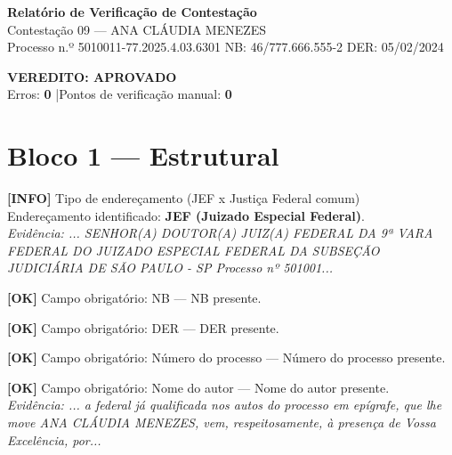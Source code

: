 \documentclass[12pt,a4paper]{article}
\newcommand{\statusOK}[1]{\textcolor{corOK}{\textbf{[OK]}} #1}
\newcommand{\statusINFO}[1]{\textcolor{corINFO}{\textbf{[INFO]}} #1}
\begin{document}
\begin{center}
  {\LARGE \textbf{Relatório de Verificação de Contestação}}\\[0.4em]
  {\large Contestação 09 --- ANA CLÁUDIA MENEZES}\\[0.2em]
  {\small Processo n.º 5010011-77.2025.4.03.6301 \quad NB: 46/777.666.555-2 \quad DER: 05/02/2024}
\end{center}

\vspace{0.5em}

\noindent\colorbox{corFundoAprovado}{%
  \begin{minipage}{\dimexpr\linewidth-2\fboxsep}
    \centering
    \vspace{0.3em}
    {\large \textcolor{corOK}{\textbf{VEREDITO: APROVADO}}}\\
    Erros: \textbf{0} \quad|\quad Pontos de verificação manual: \textbf{0}
    \vspace{0.3em}
  \end{minipage}%
}

\vspace{1em}


\section{Bloco 1 --- Estrutural}

\statusINFO{Tipo de endereçamento (JEF x Justiça Federal comum)}\\
Endereçamento identificado: \textbf{JEF (Juizado Especial Federal)}.\\
\textit{Evidência: ... SENHOR(A) DOUTOR(A) JUIZ(A) FEDERAL DA 9ª VARA FEDERAL DO JUIZADO ESPECIAL FEDERAL DA SUBSEÇÃO JUDICIÁRIA DE SÃO PAULO - SP Processo nº 501001...}

\medskip
\statusOK{Campo obrigatório: NB} --- NB presente.

\medskip
\statusOK{Campo obrigatório: DER} --- DER presente.

\medskip
\statusOK{Campo obrigatório: Número do processo} --- Número do processo presente.

\medskip
\statusOK{Campo obrigatório: Nome do autor} --- Nome do autor presente.\\
\textit{Evidência: ... a federal já qualificada nos autos do processo em epígrafe, que lhe move ANA CLÁUDIA MENEZES, vem, respeitosamente, à presença de Vossa Excelência, por...}
\end{document}

